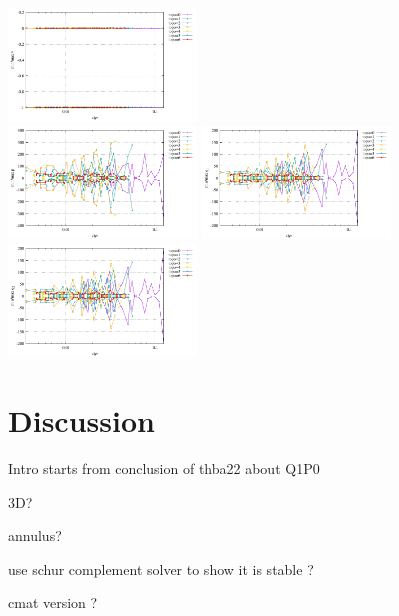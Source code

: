 \begin{center}
\includegraphics[width=5cm]{python_codes/fieldstone_78/results/stats_v_exp14.pdf}\\
\includegraphics[width=5cm]{python_codes/fieldstone_78/results/stats_p_exp14.pdf}
\includegraphics[width=5cm]{python_codes/fieldstone_78/results/stats_q1_exp14.pdf}
\includegraphics[width=5cm]{python_codes/fieldstone_78/results/stats_q2_exp14.pdf}
\end{center}







\newpage

\section*{Discussion}

Intro starts from conclusion of thba22 about Q1P0

3D?

annulus?

use schur complement solver to show it is stable ?

cmat version ? 

